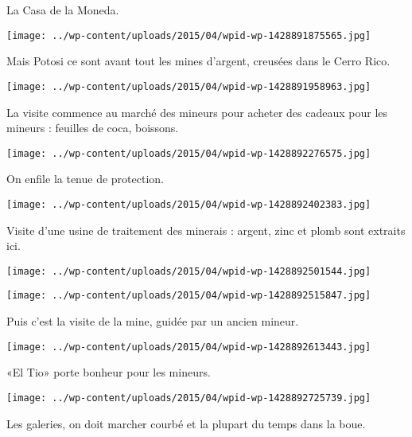  \newline
 La Casa de la Moneda.  \newline
 \newline
\centerline{\texttt{[image: ../wp-content/uploads/2015/04/wpid-wp-1428891875565.jpg]} } 
 \newline
 Mais Potosi ce sont avant tout les mines d'argent, creusées dans le Cerro Rico. \newline
 \newline
\centerline{\texttt{[image: ../wp-content/uploads/2015/04/wpid-wp-1428891958963.jpg]} } 
 \newline
 La visite commence au marché des mineurs pour acheter des cadeaux pour les mineurs : feuilles de coca, boissons. \newline
 \newline
\centerline{\texttt{[image: ../wp-content/uploads/2015/04/wpid-wp-1428892276575.jpg]} } 
 \newline
 On enfile la tenue de protection.  \newline
 \newline
\centerline{\texttt{[image: ../wp-content/uploads/2015/04/wpid-wp-1428892402383.jpg]} } 
 \newline
 Visite d'une usine de traitement des minerais : argent, zinc et plomb sont extraits ici.  \newline
 \newline
\centerline{\texttt{[image: ../wp-content/uploads/2015/04/wpid-wp-1428892501544.jpg]} } 
 \newline
 \newline
\centerline{\texttt{[image: ../wp-content/uploads/2015/04/wpid-wp-1428892515847.jpg]} } 
 \newline
 Puis c'est la visite de la mine, guidée par un ancien mineur.  \newline
 \newline
\centerline{\texttt{[image: ../wp-content/uploads/2015/04/wpid-wp-1428892613443.jpg]} } 
 \newline
 «El Tio» porte bonheur pour les mineurs.  \newline
 \newline
\centerline{\texttt{[image: ../wp-content/uploads/2015/04/wpid-wp-1428892725739.jpg]} } 
 \newline
 Les galeries, on doit marcher courbé et la plupart du temps dans la boue.  \newline
